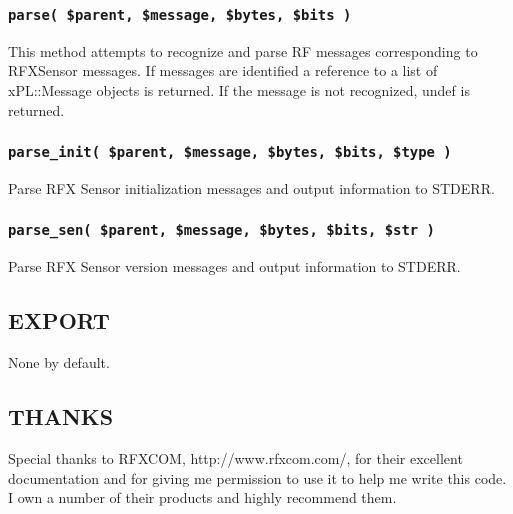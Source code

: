 \documentclass[12pt,a4paper]{article}
\begin{document}
\subsubsection*{\texttt{parse( \$parent, \$message, \$bytes, \$bits )}\label{xPL::RF::RFXSensor_parse_parent_message_bytes_bits_}}


This method attempts to recognize and parse RF messages corresponding
to RFXSensor messages.  If messages are identified a reference to a
list of xPL::Message objects is returned.  If the message is not
recognized, undef is returned.

\subsubsection*{\texttt{parse\_init( \$parent, \$message, \$bytes, \$bits, \$type )}\label{xPL::RF::RFXSensor_parse_init_parent_message_bytes_bits_type_}}


Parse RFX Sensor initialization messages and output information to STDERR.

\subsubsection*{\texttt{parse\_sen( \$parent, \$message, \$bytes, \$bits, \$str )}\label{xPL::RF::RFXSensor_parse_sen_parent_message_bytes_bits_str_}}


Parse RFX Sensor version messages and output information to STDERR.

\subsection*{EXPORT\label{xPL::RF::RFXSensor_EXPORT}}


None by default.

\subsection*{THANKS\label{xPL::RF::RFXSensor_THANKS}}


Special thanks to RFXCOM, \textsf{http://www.rfxcom.com/}, for their
excellent documentation and for giving me permission to use it to help
me write this code.  I own a number of their products and highly
recommend them.
\end{document}
